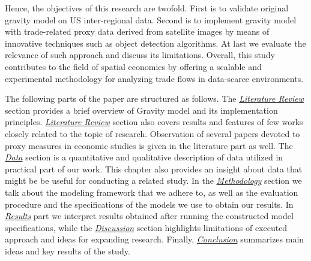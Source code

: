 Hence, the objectives of this research are twofold. First is to validate original gravity model on US inter-regional data. Second is to implement gravity model with trade-related proxy data derived from satellite images by means of innovative techniques such as object detection algorithms. At last we evaluate the relevance of such approach and discuss its limitations. Overall, this study contributes to the field of spatial economics by offering a scalable and experimental methodology for analyzing trade flows in data-scarce environments.

The following parts of the paper are structured as follows. The \hyperref[sec: litrev]{\emph{Literature Review}} section provides a brief overview of Gravity model and its implementation principles. \hyperref[sec: litrev]{\emph{Literature Review}} section also covers results and features of few works closely related to the topic of research. Observation of several papers devoted to proxy measures in economic studies is given in the literature part as well. The \hyperref[sec: data]{\emph{Data}} section is a quantitative and qualitative description of data utilized in practical part of our work. This chapter also provides an insight about data that might be be useful for conducting a related study. In the \hyperref[sec: method]{\emph{Methodology}} section we talk about the modeling framework that we adhere to, as well as the evaluation procedure and the specifications of the models we use to obtain our results. In \hyperref[sec: res]{\emph{Results}} part we interpret results obtained after running the constructed model specifications, while the \hyperref[sec: disc]{\emph{Discussion}} section highlights limitations of executed approach and ideas for expanding research. Finally, \hyperref[sec:conclusions]{\emph{Conclusion}} summarizes main ideas and key results of the study.

